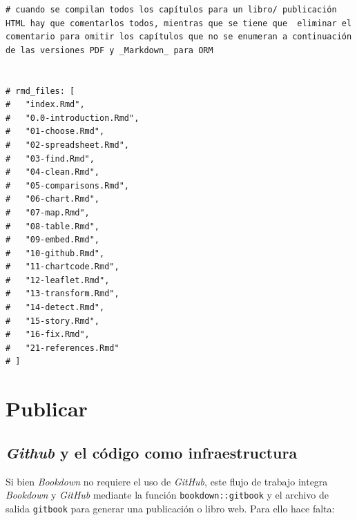 \documentclass[
]{book}
\begin{document}
\begin{verbatim}
# cuando se compilan todos los capítulos para un libro/ publicación HTML hay que comentarlos todos, mientras que se tiene que  eliminar el comentario para omitir los capítulos que no se enumeran a continuación de las versiones PDF y _Markdown_ para ORM


# rmd_files: [
#   "index.Rmd",
#   "0.0-introduction.Rmd",
#   "01-choose.Rmd",
#   "02-spreadsheet.Rmd",
#   "03-find.Rmd",
#   "04-clean.Rmd",
#   "05-comparisons.Rmd",
#   "06-chart.Rmd",
#   "07-map.Rmd",
#   "08-table.Rmd",
#   "09-embed.Rmd",
#   "10-github.Rmd",
#   "11-chartcode.Rmd",
#   "12-leaflet.Rmd",
#   "13-transform.Rmd",
#   "14-detect.Rmd",
#   "15-story.Rmd",
#   "16-fix.Rmd",
#   "21-references.Rmd"
# ]
\end{verbatim}

\hypertarget{publicar}{%
\chapter{Publicar}\label{publicar}}

\hypertarget{github-y-el-cuxf3digo-como-infraestructura}{%
\section{\texorpdfstring{\emph{Github} y el código como infraestructura}{Github y el código como infraestructura}}\label{github-y-el-cuxf3digo-como-infraestructura}}

Si bien \emph{Bookdown} no requiere el uso de \emph{GitHub}, este flujo de trabajo integra \emph{Bookdown} y \emph{GitHub} mediante la función \texttt{bookdown::gitbook} y el archivo de salida \texttt{gitbook} para generar una publicación o libro web. Para ello hace falta:
\end{document}

